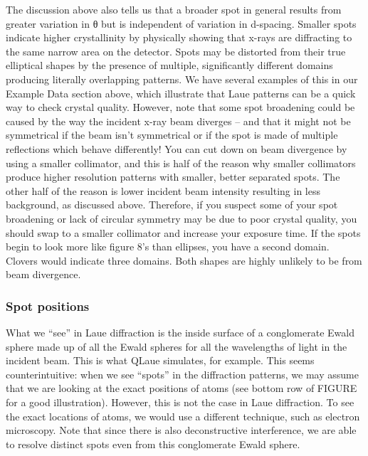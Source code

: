 The discussion above also tells us that a broader spot in general results from greater variation in θ but is independent of variation in d-spacing. Smaller spots indicate higher crystallinity by physically showing that x-rays are diffracting to the same narrow area on the detector. Spots may be distorted from their true elliptical shapes by the presence of multiple, significantly different domains producing literally overlapping patterns. We have several examples of this in our Example Data section above, which illustrate that Laue patterns can be a quick way to check crystal quality. However, note that some spot broadening could be caused by the way the incident x-ray beam diverges – and that it might not be symmetrical if the beam isn’t symmetrical or if the spot is made of multiple reflections which behave differently!
You can cut down on beam divergence by using a smaller collimator, and this is half of the reason why smaller collimators produce higher resolution patterns with smaller, better separated spots. The other half of the reason is lower incident beam intensity resulting in less background, as discussed above.
Therefore, if you suspect some of your spot broadening or lack of circular symmetry may be due to poor crystal quality, you should swap to a smaller collimator and increase your exposure time. If the spots begin to look more like figure 8’s than ellipses, you have a second domain. Clovers would indicate three domains. Both shapes are highly unlikely to be from beam divergence. 
\subsubsection{Spot positions}
What we “see” in Laue diffraction is the inside surface of a conglomerate Ewald sphere made up of all the Ewald spheres for all the wavelengths of light in the incident beam. This is what QLaue simulates, for example.
This seems counterintuitive: when we see “spots” in the diffraction patterns, we may assume that we are looking at the exact positions of atoms (see bottom row of FIGURE for a good illustration). However, this is not the case in Laue diffraction. To see the exact locations of atoms, we would use a different technique, such as electron microscopy.
Note that since there is also deconstructive interference, we are able to resolve distinct spots even from this conglomerate Ewald sphere. 
